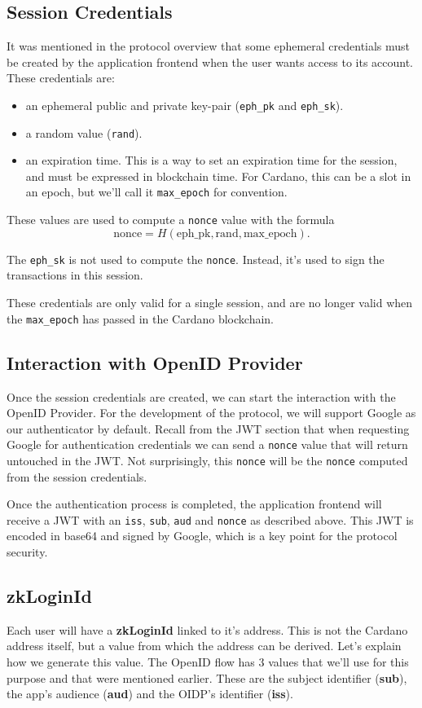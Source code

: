 \documentclass{article}
\begin{document}
\subsection{Session Credentials}
It was mentioned in the protocol overview that some ephemeral credentials must be created by the application frontend when the user wants access to its account. These credentials are:
\begin{itemize}
    \item an ephemeral public and private key-pair (\texttt{eph\_pk} and \texttt{eph\_sk}).
    \item a random value (\texttt{rand}).
    \item an expiration time. This is a way to set an expiration time for the session, and must be expressed in blockchain time. For Cardano, this can be a slot in an epoch, but we'll call it \texttt{max\_epoch} for convention.
\end{itemize}

These values are used to compute a \texttt{nonce} value with the formula
\[
    \text{nonce} = H(\text{eph\_pk}, \text{rand}, \text{max\_epoch}).
\]

The \texttt{eph\_sk} is not used to compute the \texttt{nonce}. Instead, it's used to sign the transactions in this session.

These credentials are only valid for a single session, and are no longer valid when the \texttt{max\_epoch} has passed in the Cardano blockchain.

\subsection{Interaction with OpenID Provider}
Once the session credentials are created, we can start the interaction with the OpenID Provider. For the development of the protocol, we will support Google as our authenticator by default. Recall from the JWT section that when requesting Google for authentication credentials we can send a \texttt{nonce} value that will return untouched in the JWT. Not surprisingly, this \texttt{nonce} will be the \texttt{nonce} computed from the session credentials.

Once the authentication process is completed, the application frontend will receive a JWT with an \texttt{iss}, \texttt{sub}, \texttt{aud} and \texttt{nonce} as described above. This JWT is encoded in base64 and signed by Google, which is a key point for the protocol security.

\subsection{zkLoginId}
Each user will have a \textbf{zkLoginId} linked to it's address. This is not the Cardano address itself, but a value from which the address can be derived. Let's explain how we generate this value. The OpenID flow has 3 values that we'll use for this purpose and that were mentioned earlier. These are the subject identifier (\textbf{sub}), the app's audience (\textbf{aud}) and the OIDP's identifier (\textbf{iss}).
\end{document}
